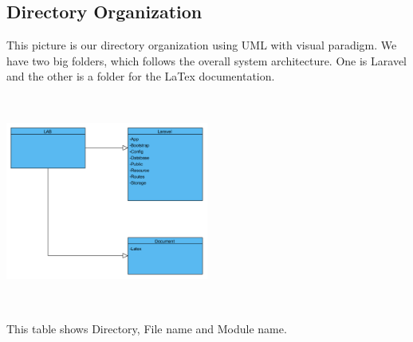 \documentclass[letterpaper, 10 pt, conference]{ieeeconf}  %
\begin{document}
\subsection{Directory Organization}
This picture is our directory organization using UML with visual paradigm. We have two big folders, which follows the overall system architecture. One is Laravel and the other is a folder for the LaTex documentation.
\begin{center}
\includegraphics[width=0.5\textwidth,height = 7cm]{bibliographies/image/module1.png}
\end{center}

This table shows Directory, File name and Module name.
\end{document}
